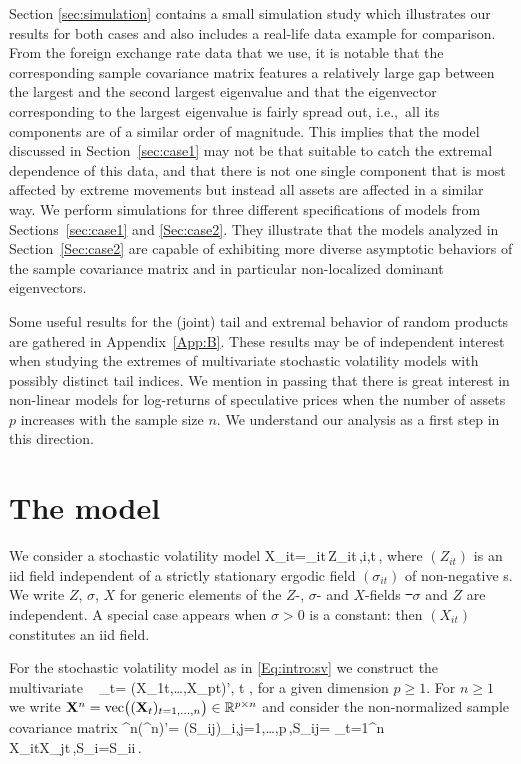 Section \ref{sec:simulation} contains a small simulation study which
illustrates our results for both cases and also includes a real-life
data example for comparison. From the foreign exchange rate data that
we use, it is notable that the corresponding sample covariance matrix
features a relatively large gap between the largest and the second
largest eigenvalue and that the eigenvector corresponding to the
largest eigenvalue is fairly spread out, i.e.,\ all its components are
of a similar order of magnitude. This implies that the model discussed
in Section~\ref{sec:case1} may not be that suitable to catch the
extremal dependence of this data, and that there is not one single
component that is most affected by extreme movements but instead all
assets are affected in a similar way. We perform simulations for three
different specifications of models from Sections~\ref{sec:case1} and
\ref{Sec:case2}. They illustrate that the models analyzed 
in Section~\ref{Sec:case2} are capable of exhibiting more diverse
asymptotic behaviors of the sample covariance matrix and in particular
non-localized dominant eigenvectors.

Some useful results for the (joint) tail and extremal behavior of
random products are gathered in Appendix~\ref{App:B}.
These results may be of independent interest when studying the
extremes of multivariate stochastic volatility models with possibly
distinct tail indices. We mention in passing that there is great
interest in non-linear models for log-returns of speculative prices
when the number of assets $p$ increases with the sample size $n$. We
understand our analysis as a first step in this direction. 



\section{The model}\label{sec:model:anja}\setcounter{equation}{0}
We consider a stochastic volatility model
\beam\label{eq:1a:anja}
X_{it}=\sigma_{it}\,Z_{it}\,,\qquad i,t\in\bbz\,,
\eeam
where $(Z_{it})$ is an iid field independent of a strictly stationary
ergodic field $(\sigma_{it})$ of non-negative \rv s.
We write $Z$, $\sigma$, $X$ for generic elements of the $Z$-,
$\sigma$- and $X$-fields \st\ $\sigma$ and $Z$ are independent.
A special case appears when $\sigma>0$ is a constant: then $(X_{it})$ constitutes an iid field. 

For the stochastic volatility model as in \eqref{Eq:intro:sv} we construct the 
multivariate \ts\ 
\beam\label{eq:multvts}
 \bfX_t= (X_{1t},\ldots,X_{pt})', \;\;\; t \in {},
\eeam 
for a given dimension $p\ge 1$. For $n\geq 1$ we write ${\bf X}^n={\rm
  vec}\big(({\bf X}_t)_{t=1, \ldots, n}\big) \in \mathbb{R}^{p \times n}$
and consider the non-normalized sample covariance matrix
\beam\label{eq:esses}
\bfX^n(\bfX^n)'= (S_{ij})_{i,j=1,\ldots,p}\,,\qquad S_{ij}=
\sum_{t=1}^n X_{it}X_{jt}\,,\qquad S_i=S_{ii}\,.
\eeam

